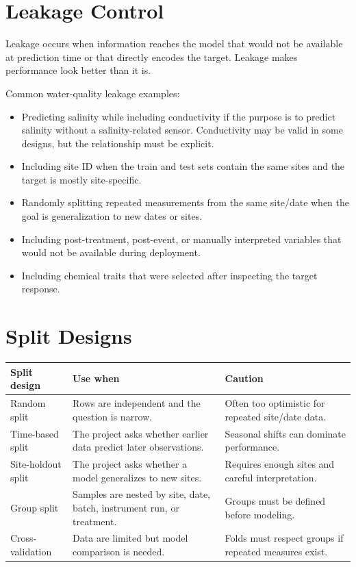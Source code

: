 \section{Leakage Control}

Leakage occurs when information reaches the model that would not be available at prediction time or that directly encodes the target. Leakage makes performance look better than it is.

Common water-quality leakage examples:
\begin{itemize}
  \item Predicting salinity while including conductivity if the purpose is to predict salinity without a salinity-related sensor. Conductivity may be valid in some designs, but the relationship must be explicit.
  \item Including site ID when the train and test sets contain the same sites and the target is mostly site-specific.
  \item Randomly splitting repeated measurements from the same site/date when the goal is generalization to new dates or sites.
  \item Including post-treatment, post-event, or manually interpreted variables that would not be available during deployment.
  \item Including chemical traits that were selected after inspecting the target response.
\end{itemize}

\section{Split Designs}

\begin{longtable}{p{}p{}p{}}
\toprule
\textbf{Split design} & \textbf{Use when} & \textbf{Caution} \\
\midrule
Random split & Rows are independent and the question is narrow. & Often too optimistic for repeated site/date data. \\
Time-based split & The project asks whether earlier data predict later observations. & Seasonal shifts can dominate performance. \\
Site-holdout split & The project asks whether a model generalizes to new sites. & Requires enough sites and careful interpretation. \\
Group split & Samples are nested by site, date, batch, instrument run, or treatment. & Groups must be defined before modeling. \\
Cross-validation & Data are limited but model comparison is needed. & Folds must respect groups if repeated measures exist. \\
\bottomrule
\end{longtable}

